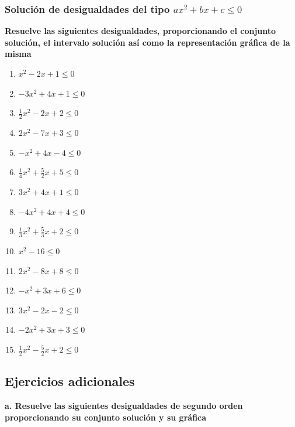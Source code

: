 \documentclass[12pt]{article}
\begin{document}
{\subsubsection{Solución de desigualdades del tipo \(ax^2+bx+c\leq 0\)}
\textbf{Resuelve las siguientes desigualdades, proporcionando el conjunto solución, el intervalo solución así como la representación gráfica de la misma}

\begin{enumerate}
\def\labelenumi{\arabic{enumi}.}
\item
  \(x^2-2x+1\leq0\)
\item
  \(-3x^2+4x+1\leq0\)
\item
  \(\frac{1}{2}x^2-2x+2\leq0\)
\item
  \(2x^2-7x+3\leq0\)
\item
  \(-x^2+4x-4\leq0\)
\item
  \(\frac{1}{4}x^2+\frac{5}{2}x+5\leq0\)
\item
  \(3x^2+4x+1\leq0\)
\item
  \(-4x^2+4x+4\leq0\)
\item
  \(\frac{1}{3}x^2+\frac{5}{3}x+2\leq0\)
\item
  \(x^2-16\leq0\)
\item
  \(2x^2-8x+8\leq0\)
\item
  \(-x^2+3x+6\leq0\)
\item
  \(3x^2-2x-2\leq0\)
\item
  \(-2x^2+3x+3\leq0\)
\item
  \(\frac{1}{2}x^2-\frac{5}{2}x+2\leq0\)
\end{enumerate}

\subsection{Ejercicios adicionales}\label{ejercicios-adicionales-1}

\textbf{a. Resuelve las siguientes desigualdades de segundo orden
proporcionando su conjunto solución y su gráfica}

}
\end{document}
